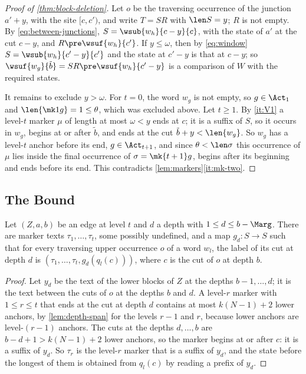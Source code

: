 \begin{proof}[Proof of \cref{thm:block-deletion}]
Let $o$ be the traversing occurrence of the junction $a'+y$, with the site
$[c,c')$, and write $T=SR$ with $\len S=y$; $R$ is not empty. By
\eqref{eq:between-junctions}, $S=\wsub{w_h}{c-y}{c}$, with the state of $a'$
at the cut $c-y$, and $R\pre\wsuf{w_h}{c'}$. If $y\le\omega$, then by
\eqref{eq:window} $S=\wsub{w_h}{c'-y}{c'}$ and the state at $c'-y$ is that
at $c-y$; so $\wsuf{w_g}{\tilde b}=SR\pre\wsuf{w_h}{c'-y}$ is a comparison
of $W$ with the required states.

It remains to exclude $y>\omega$. For $t=0$, the word $w_g$ is not empty, so
$g\in\Act_1$ and $\len{\mk1g}=1\le\theta$, which was excluded above. Let
$t\ge1$. By \ref{it:V1} a level-$t$ marker $\mu$ of length at most
$\omega<y$ ends at $c$; it is a suffix of $S$, so it occurs in $w_g$, begins
at or after $\tilde b$, and ends at the cut $\tilde b+y<\len{w_g}$. So $w_g$
has a level-$t$ anchor before its end, $g\in\Act_{t+1}$, and since
$\theta<\len\sigma$ this occurrence of $\mu$ lies inside the final
occurrence of $\sigma=\mk{t+1}g$, begins after its beginning and ends before
its end. This contradicts \cref{lem:markers}\eqref{it:mk-two}.
\end{proof}

\subsection{The Bound}\label{app:fresh-bound}

\begin{lemma}\label{lem:labels-local}
Let $(Z,a,b)$ be an edge at level $t$ and $d$ a depth with $1\le d\le
b-\Marg$. There are marker texts $\tau_1,\dots,\tau_t$, some possibly
undefined, and a map $g_d\colon S\to S$ such that for every traversing upper
occurrence $o$ of a word $w_l$, the label of its cut at depth $d$ is
$(\tau_1,\dots,\tau_t,g_d(q_l(c)))$, where $c$ is the cut of $o$ at depth
$b$.
\end{lemma}

\begin{proof}
Let $y_d$ be the text of the lower blocks of $Z$ at the depths
$b-1,\dots,d$; it is the text between the cuts of $o$ at the depths $b$ and
$d$. A level-$r$ marker with $1\le r\le t$ that ends at the cut at depth $d$
contains at most $k(N-1)+2$ lower anchors, by \cref{lem:depth-span} for the
levels $r-1$ and $r$, because lower anchors are level-$(r-1)$ anchors. The
cuts at the depths $d,\dots,b$ are $b-d+1>k(N-1)+2$ lower anchors, so the
marker begins at or after $c$: it is a suffix of $y_d$. So $\tau_r$ is the
level-$r$ marker that is a suffix of $y_d$, and the state before the longest
of them is obtained from $q_l(c)$ by reading a prefix of $y_d$.
\end{proof}

